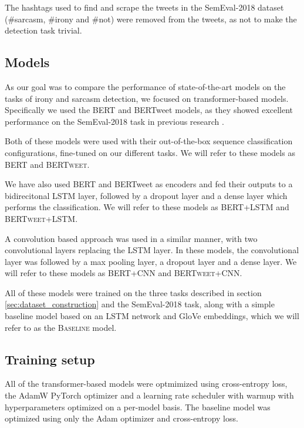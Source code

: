 \documentclass[10pt, a4paper]{article}
\begin{document}
The hashtags used to find and scrape the tweets in the SemEval-2018 dataset (\#sarcasm, \#irony and \#not) were removed
from the tweets, as not to make the detection task trivial.

\subsection{Models}\label{sec:models}

As our goal was to compare the performance of state-of-the-art models on the tasks of irony and sarcasm detection, we 
focused on transformer-based models. Specifically we used the BERT \citep{devlin-etal-2019-bert} and BERTweet \citep{bertweet} models,
as they showed excellent performance on the SemEval-2018 task in previous research \citep{transformers4irony-2020,bertweet}.

Both of these models were used with their out-of-the-box sequence classification configurations, fine-tuned on our 
different tasks. We will refer to these models as \textsc{BERT} and \textsc{BERTweet}.

We have also used BERT and BERTweet as encoders and fed their outputs to a bidirecitonal LSTM layer, followed by 
a dropout layer and a dense layer which performs the classification. We will refer to these models as \textsc{BERT+LSTM}
and \textsc{BERTweet+LSTM}. 

A convolution based approach was used in a similar manner, with two convolutional layers
replacing the LSTM layer. In these models, the convolutional layer was followed by a max pooling layer, a dropout layer
and a dense layer. We will refer to these models as \textsc{BERT+CNN} and \textsc{BERTweet+CNN}.

All of these models were trained on the three tasks described in section \ref{sec:dataset_construction} and the SemEval-2018
task, along with a simple baseline model based on an LSTM network and GloVe embeddings, which we will refer to as the
\textsc{Baseline} model. 

\subsection{Training setup}
All of the transformer-based models were optmimized using cross-entropy loss, the AdamW PyTorch optimizer and a
learning rate scheduler with warmup with hyperparameters optimized on a per-model basis. The baseline model
was optimized using only the Adam optimizer and cross-entropy loss.
\end{document}
